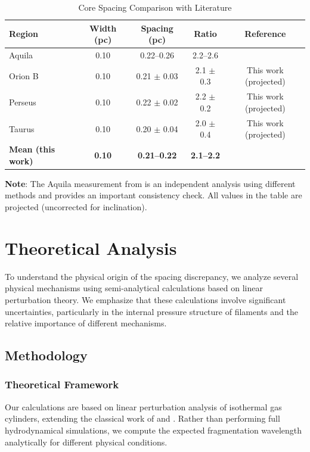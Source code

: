 \documentclass[11pt,a4paper]{article}
\begin{document}
\begin{table}[H]
\centering
\caption{Core Spacing Comparison with Literature}
\begin{tabular}{lcccc}
\toprule
Region & Width (pc) & Spacing (pc) & Ratio & Reference \\
\midrule
Aquila & 0.10 & 0.22--0.26 & 2.2--2.6 & \citet{Arzoumanian2019} \\
\midrule
Orion B & 0.10 & 0.21 $\pm$ 0.03 & 2.1 $\pm$ 0.3 & This work (projected) \\
Perseus & 0.10 & 0.22 $\pm$ 0.02 & 2.2 $\pm$ 0.2 & This work (projected) \\
Taurus & 0.10 & 0.20 $\pm$ 0.04 & 2.0 $\pm$ 0.4 & This work (projected) \\
\midrule
\textbf{Mean (this work)} & \textbf{0.10} & \textbf{0.21--0.22} & \textbf{2.1--2.2} &  \\
\bottomrule
\end{tabular}
\end{table}

\noindent\textbf{Note}: The Aquila measurement from \citet{Arzoumanian2019} is an independent analysis using different methods and provides an important consistency check. All values in the table are projected (uncorrected for inclination).

\section{Theoretical Analysis}

To understand the physical origin of the spacing discrepancy, we analyze several physical mechanisms using semi-analytical calculations based on linear perturbation theory. We emphasize that these calculations involve significant uncertainties, particularly in the internal pressure structure of filaments and the relative importance of different mechanisms.

\subsection{Methodology}

\subsubsection{Theoretical Framework}
Our calculations are based on linear perturbation analysis of isothermal gas cylinders, extending the classical work of \citet{Inutsuka1992, Inutsuka1997} and \citet{Larson1985}. Rather than performing full hydrodynamical simulations, we compute the expected fragmentation wavelength analytically for different physical conditions.
\end{document}
